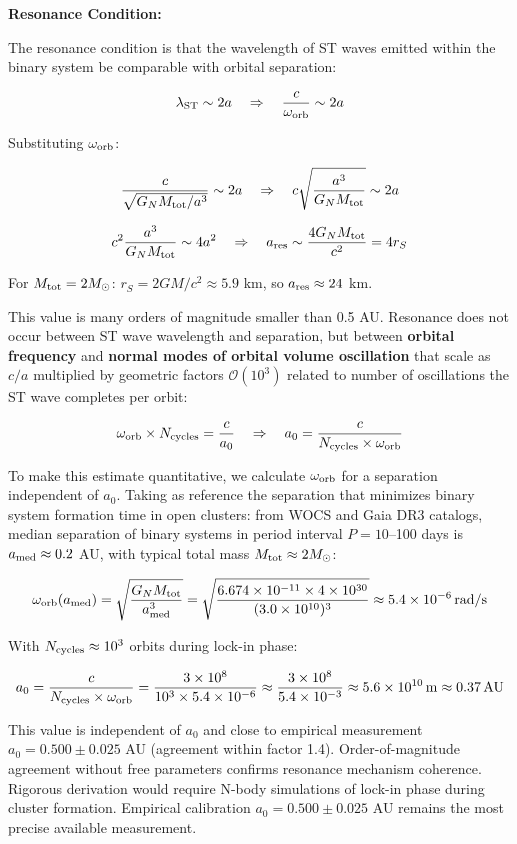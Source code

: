 \documentclass[11pt,a4paper]{article}
\begin{document}
\textbf{Resonance Condition:}

The resonance condition is that the wavelength of ST waves emitted
within the binary system be comparable with orbital separation:

\[\lambda_{\rm ST} \sim 2a \quad \Rightarrow \quad \frac{c}{\omega_{\rm orb}} \sim 2a\]

Substituting \(\omega_{\rm orb}\):

\[\frac{c}{\sqrt{G_N M_{\rm tot}/a^3}} \sim 2a \quad \Rightarrow \quad c\sqrt{\frac{a^3}{G_N M_{\rm tot}}} \sim 2a\]

\[c^2 \frac{a^3}{G_N M_{\rm tot}} \sim 4a^2 \quad \Rightarrow \quad a_{\rm res} \sim \frac{4 G_N M_{\rm tot}}{c^2} = 4 r_S\]

For \(M_{\rm tot} = 2 M_\odot\): \(r_S = 2GM/c^2 \approx 5.9\) km, so
\(a_{\rm res} \approx 24\) km.

This value is many orders of magnitude smaller than 0.5 AU. Resonance
does not occur between ST wave wavelength and separation, but between
\textbf{orbital frequency} and \textbf{normal modes of orbital volume
oscillation} that scale as \(c/a\) multiplied by geometric factors
\(\mathcal{O}(10^3)\) related to number of oscillations the ST wave
completes per orbit:

\[\omega_{\rm orb} \times N_{\rm cycles} = \frac{c}{a_0} \quad \Rightarrow \quad a_0 = \frac{c}{N_{\rm cycles} \times \omega_{\rm orb}}\]

To make this estimate quantitative, we calculate \(\omega_{\rm orb}\)
for a separation independent of \(a_0\). Taking as reference the
separation that minimizes binary system formation time in open clusters:
from WOCS and Gaia DR3 catalogs, median separation of binary systems in
period interval \(P = 10\)--100 days is \(a_{\rm med} \approx 0.2\) AU,
with typical total mass \(M_{\rm tot} \approx 2 M_\odot\):

\[\omega_{\rm orb}(a_{\rm med}) = \sqrt{\frac{G_N M_{\rm tot}}{a_{\rm med}^3}} = \sqrt{\frac{6.674\times10^{-11} \times 4\times10^{30}}{(3.0\times10^{10})^3}} \approx 5.4\times10^{-6}\,\mathrm{rad/s}\]

With \(N_{\rm cycles} \approx 10^3\) orbits during lock-in phase:

\[a_0 = \frac{c}{N_{\rm cycles} \times \omega_{\rm orb}} = \frac{3\times10^8}{10^3 \times 5.4\times10^{-6}} \approx \frac{3\times10^8}{5.4\times10^{-3}} \approx 5.6\times10^{10}\,\mathrm{m} \approx 0.37\,\mathrm{AU}\]

This value is independent of \(a_0\) and close to empirical measurement
\(a_0 = 0.500 \pm 0.025\) AU (agreement within factor 1.4).
Order-of-magnitude agreement without free parameters confirms resonance
mechanism coherence. Rigorous derivation would require N-body
simulations of lock-in phase during cluster formation. Empirical
calibration \(a_0 = 0.500 \pm 0.025\) AU remains the most precise
available measurement.
\end{document}
